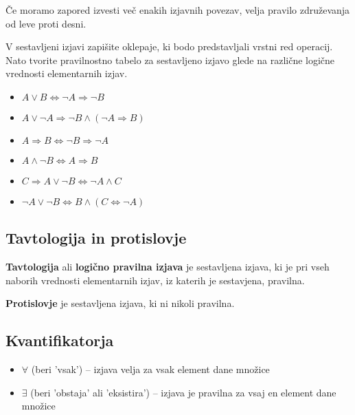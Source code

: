               
                Če moramo zapored izvesti več enakih izjavnih povezav, velja pravilo združevanja 
                od leve proti desni.
             
         

         
             \begin{naloga}
                V sestavljeni izjavi zapišite oklepaje, ki bodo predstavljali vrstni red operacij.
                Nato tvorite pravilnostno tabelo za sestavljeno izjavo glede na različne logične 
                vrednosti elementarnih izjav.
                \begin{itemize}
                    \item $A\lor B\Leftrightarrow \lnot A\Rightarrow \lnot B$
                    \item $A\lor \lnot A\Rightarrow\lnot B\land (\lnot A\Rightarrow B) $
                    \item $A\Rightarrow B\Leftrightarrow \lnot B\Rightarrow \lnot A $
                    \item $A\land \lnot B\Leftrightarrow A \Rightarrow B$
                    \item $C\Rightarrow A\lor \lnot B\Leftrightarrow \lnot A\land C $
                    \item $\lnot A\lor \lnot B\Leftrightarrow B \land (C\Leftrightarrow \lnot A) $
                \end{itemize}
            \end{naloga}
         

         
             \subsection{Tavtologija in protislovje}

                \textbf{Tavtologija} ali \textbf{logično pravilna izjava} je sestavljena izjava, 
                ki je pri vseh naborih vrednosti elementarnih izjav, iz katerih je sestavjena, pravilna.
             
                \textbf{Protislovje} je sestavljena izjava, ki ni nikoli pravilna.
             

             \subsection{Kvantifikatorja}
                \begin{itemize}
                    \item $\forall$ (beri 'vsak') -- izjava velja za vsak element dane množice
                    \item $\exists$ (beri 'obstaja' ali 'eksistira') -- izjava je pravilna za vsaj en element dane množice
                \end{itemize}
             

